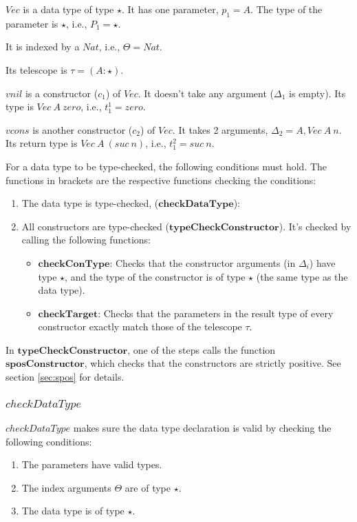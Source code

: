 $Vec$ is a data type of type $\star$. It has one parameter, $p_1 = A$. The type of the parameter is $\star$, i.e., $P_1 = \star$.

It is indexed by a $Nat$, i.e., $\Theta = Nat$.

Its telescope is $\tau = (A : \star)$.

$vnil$ is a constructor ($c_1$) of $Vec$. It doesn't take any argument ($\Delta_1$ is empty). Its type is $Vec \: A \: zero$, i.e., $t_1^1 = zero$.

$vcons$ is another constructor ($c_2$) of $Vec$. It takes 2 arguments, $\Delta_2 = A, Vec \: A \: n$. Its return type is $Vec \: A \: (suc \: n)$, i.e., $t^2_1 = suc \: n$.

For a data type to be type-checked, the following conditions must hold. The functions in brackets are the respective functions checking the conditions:

\begin{enumerate}
  \item The data type is type-checked, ($\boldsymbol{checkDataType}$):
  \item All constructors are type-checked ($\boldsymbol{typeCheckConstructor}$). It's checked by calling the following functions:
        \begin{itemize}
          \item  $\boldsymbol{checkConType}$: Checks that the constructor arguments (in $\Delta_i$) have type $\star$, and the type of the constructor is of type $\star$ (the same type as the data type).
          \item  $\boldsymbol{checkTarget}$: Checks that the parameters in the result type of every constructor exactly match those of the telescope $\tau$.
        \end{itemize}
\end{enumerate}

In $\boldsymbol{typeCheckConstructor}$, one of the steps calls the function $\boldsymbol{sposConstructor}$, which checks that the constructors are strictly positive. See section \ref{sec:spos} for details.

\subsubsection{$checkDataType$}

$checkDataType$ makes sure the data type declaration is valid by checking the following conditions:

\begin{enumerate}
  \item The parameters have valid types.
  \item The index arguments $\Theta$ are of type $\star$.
  \item The data type is of type $\star$.
\end{enumerate}

